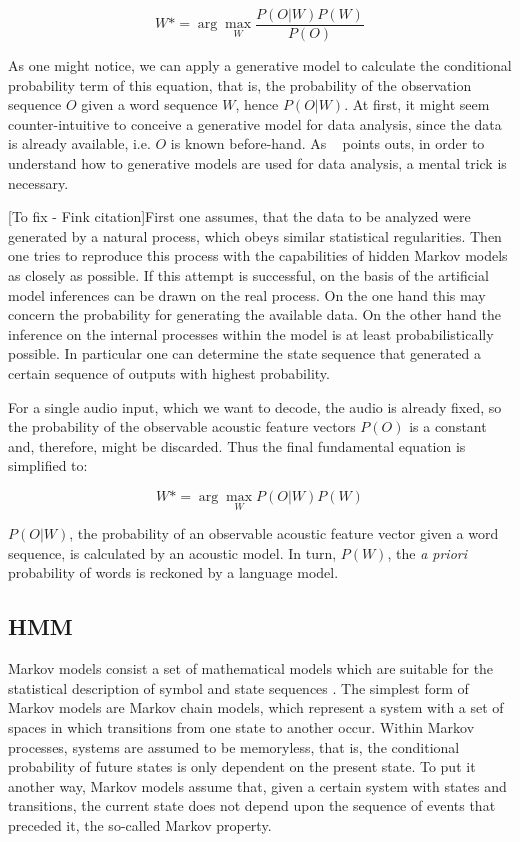 \begin{equation}
W*= \arg\max_{W}\frac{P(O|W)P(W)}{P(O)}
\end{equation}

As one might notice, we can apply a generative model to calculate the conditional probability term of this
equation, that is, the probability of the observation sequence $O$ given a word sequence $W$, hence $P(O|W)$.
At first, it might seem counter-intuitive to conceive a generative model for data analysis, since the 
data is already available, i.e. $O$ is known before-hand. As \citeauthor{Fink2008}~\citep{Fink2008} points 
outs, in order to understand how to generative models are used for data analysis, a mental trick is necessary.

[To fix - Fink citation]First one assumes, that the data
to be analyzed were generated by a natural process, which obeys similar statistical
regularities. Then one tries to reproduce this process with the capabilities of hidden
Markov models as closely as possible. If this attempt is successful, on the basis of
the artificial model inferences can be drawn on the real process. On the one hand
this may concern the probability for generating the available data. On the other hand
the inference on the internal processes within the model is at least probabilistically
possible. In particular one can determine the state sequence that generated a certain
sequence of outputs with highest probability.

For a single audio input, which we want to decode, the audio is already fixed, so the 
probability of the observable acoustic feature vectors $P(O)$ is a constant and, therefore, 
might be discarded. Thus the final fundamental equation is simplified to:

\begin{equation}
W*= \arg\max_{W}P(O|W)P(W)
\end{equation}

$P(O|W)$, the probability of an observable acoustic feature vector given a word sequence, is calculated by 
an acoustic model. In turn, $P(W)$, the \emph{a priori} probability of words is reckoned by a language model.

\subsection{HMM}

Markov models consist a set of mathematical models which are suitable for the statistical description of symbol
and state sequences \cite{Fink2008}. The simplest form of Markov models are Markov chain models, 
which represent a system with a set of spaces in which transitions from one state to another occur. 
Within Markov processes, systems are assumed to be memoryless, that is, the conditional probability
of future states is only dependent on the present state. To put it another way, Markov models assume that,
given a certain system with states and transitions, the current state does not depend upon the 
sequence of events that preceded it, the so-called Markov property. 

